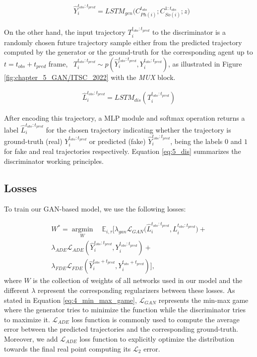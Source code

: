 \begin{eqnarray}
	\label{eq:5_gen_dec}
	& \hat{Y}_i^{t_{obs}:t_{pred}} = LSTM_{gen}\big(C_{Ph(i)}^{t_{obs}}; C_{So(i)}^{1:t_{obs}}; z\big)
\end{eqnarray}

On the other hand, the input trajectory $T_i^{t_{obs}:t_{pred}}$ to the discriminator is a randomly chosen future trajectory sample either from the predicted trajectory computed by the generator or the ground-truth for the corresponding agent up to $t = t_{obs} + t_{pred}$ frame, \ie \ $T_i^{t_{obs}:t_{pred}}\sim p(\hat{Y}_i^{t_{obs}:t_{pred}},Y_i^{t_{obs}:t_{pred}})$, as illustrated in Figure \ref{fig:chapter_5_GAN/ITSC_2022} with the \textit{MUX} block.

\begin{eqnarray}
	\label{eq:5_dis}
	\hat{L}_{i}^{t_{obs}:t_{pred}} = LSTM_{dis}(T_i^{t_{obs}:t_{pred}})
\end{eqnarray}

After encoding this trajectory, a \ac{MLP} module and softmax operation returns a label $\hat{L}_{i}^{t_{obs}:t_{pred}}$ for the chosen trajectory indicating whether the trajectory is ground-truth (real) $Y_i^{t_{obs}:t_{pred}}$ or predicted (fake) $\hat{Y}_i^{t_{obs}:t_{pred}}$, being the labels $0$ and $1$ for fake and real trajectories respectively. Equation \ref{eq:5_dis} summarizes the discriminator working principles. 

\subsection{Losses}
\label{subsec:5_losses}

To train our \ac{GAN}-based model, we use the following losses:

\begin{eqnarray}
	\label{eq:obj}
	W^* =\operatorname*{argmin}_W \quad\mathbb{E}_{i,\tau}[\lambda_{gan} \mathcal{L}_{GAN}\big(\hat{L}_{i}^{t_{obs}:t_{pred}}, L_{i}^{t_{obs}:t_{pred}} \big)+ \nonumber\\
	\lambda_{ADE} \mathcal{L}_{ADE}(\hat{Y}_i^{t_{obs}:t_{pred}},Y_i^{t_{obs}:t_{pred}})+ \nonumber\\
	\lambda_{FDE} \mathcal{L}_{FDE}(\hat{Y}_i^{t_{obs}+t_{pred}},Y_i^{t_{obs}+t_{pred}})],
\end{eqnarray}
%
where $W$ is the collection of weights of all networks used in our model and the different $\lambda$ represent the corresponding regularizers between these losses. As stated in Equation \ref{eq:4_min_max_game}, $\mathcal{L}_{GAN}$ represents the min-max game where the generator tries to minimize the function while the discriminator tries to maximize it. $\mathcal{L}_{ADE}$ loss function is commonly used to compute the average error between the predicted trajectories and the corresponding ground-truth. Moreover, we add $\mathcal{L}_{ADE}$ loss function to explicitly optimize the distribution towards the final real point computing its $\mathcal{L}_2$ error.

